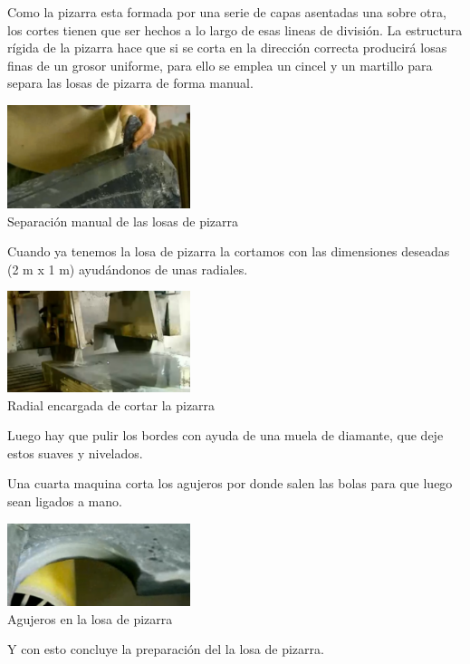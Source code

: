 Como la pizarra esta formada por una serie de capas asentadas una sobre otra, los cortes tienen que ser hechos  a lo largo de esas lineas de división.
  La estructura rígida  de la pizarra hace que si se corta en la dirección correcta producirá losas finas de un grosor uniforme, para ello se emplea un cincel y un martillo para separa las losas de pizarra de forma manual.
	\begin{center}
	    		\includegraphics[width=0.4\textwidth]{Pantallazo-5.png}
			\\ \small {Separación manual de las losas de pizarra}
	\end{center}

Cuando ya tenemos la losa de pizarra la cortamos con las dimensiones deseadas (2 m x 1 m) ayudándonos de unas radiales. 
\begin{center}
	    		\includegraphics[width=0.4\textwidth]{Pantallazo-6.png}
		        \\ \small {Radial encargada de cortar la pizarra}

	\end{center}

Luego hay que  pulir los bordes con ayuda de una muela de diamante, que deje estos suaves y nivelados.


Una cuarta maquina corta los agujeros por donde salen las bolas para que luego sean ligados a mano.

\begin{center}
	    		\includegraphics[width=0.4\textwidth]{Pantallazo-7.png}
      \\ \small {Agujeros en la losa de pizarra}


	\end{center}
 Y con esto concluye la preparación del la losa de pizarra.

